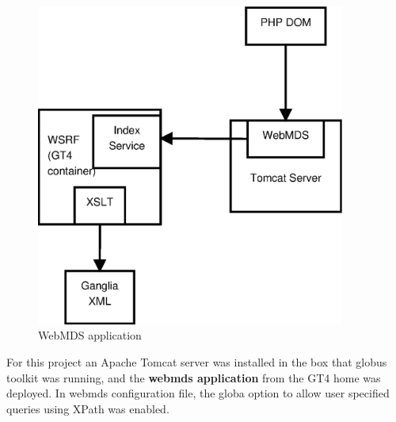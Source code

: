 \begin{figure}[htb]
\centering
 \includegraphics[width=4in]{images/webmds.eps}
\caption{WebMDS application}
\label{figure:webmds}
\end{figure}

For this project an Apache Tomcat server was installed in the box that globus toolkit was running, and the {\bf webmds application} from the GT4 home was deployed. In webmds configuration file, the globa option to allow user specified queries using XPath was enabled.
